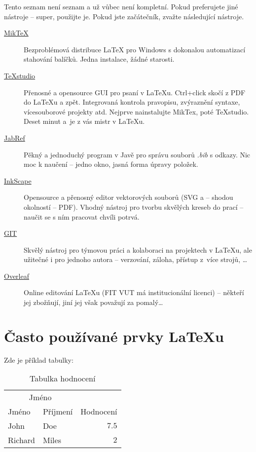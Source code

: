 Tento seznam není seznam a už vůbec není kompletní. Pokud preferujete jiné nástroje -- super, použijte je. Pokud jste začátečník, zvažte následující nástroje.

\begin{description}
	\item[\href{http://miktex.org/download}{MikTeX}] Bezproblémová distribuce \LaTeX{} pro Windows s dokonalou automatizací stahování balíčků. Jedna instalace, žádné starosti.
	\item[\href{http://texstudio.sourceforge.net/}{TeXstudio}] Přenosné a opensource GUI pro psaní v \LaTeX{}u.  Ctrl+click skočí z PDF do \LaTeX{}u a zpět. Integrovaná kontrola pravopisu, zvýraznění syntaxe, vícesouborové projekty atd. Nejprve nainstalujte MikTex, poté TeXstudio. Deset minut a~je z vás mistr v \LaTeX{}u.
	\item[\href{http://jabref.sourceforge.net/download.php}{JabRef}] Pěkný a jednoduchý program v Javě pro správu souborů \textit{.bib} s odkazy. Nic moc k naučení -- jedno okno, jasná forma úpravy položek.
	\item[\href{https://inkscape.org/en/download/}{InkScape}] Opensource a přenosný editor vektorových souborů (SVG a -- shodou okolností -- PDF). Vhodný nástroj pro tvorbu skvělých kreseb do prací -- naučit se s ním pracovat chvíli potrvá.
	\item[\href{https://git-scm.com/}{GIT}] Skvělý nástroj pro týmovou práci a kolaboraci na projektech v \LaTeX{}u, ale užitečné i pro jednoho autora -- verzování, záloha, přístup z~více strojů, \ldots
	\item[\href{http://www.overleaf.com/edu/but}{Overleaf}] Online editování \LaTeX{}u (FIT VUT má institucionální licenci)  -- někteří jej zbožňují, jiní jej však považují za pomalý\ldots
\end{description}


\section{Často používané prvky \LaTeX{}u}
\label{sec:Fragments}

Zde je příklad tabulky:
\begin{table}[h]
	\vskip6pt
	\caption{Tabulka hodnocení}
	\centering
	\begin{tabular}{llr}
		\toprule
		\multicolumn{2}{c}{Jméno} \\
		\cmidrule(r){1-2}
		Jméno & Příjmení & Hodnocení \\
		\midrule
		John & Doe & $7.5$ \\
		Richard & Miles & $2$ \\
		\bottomrule
	\end{tabular}
	\label{tab:ExampleTable}
\end{table}

